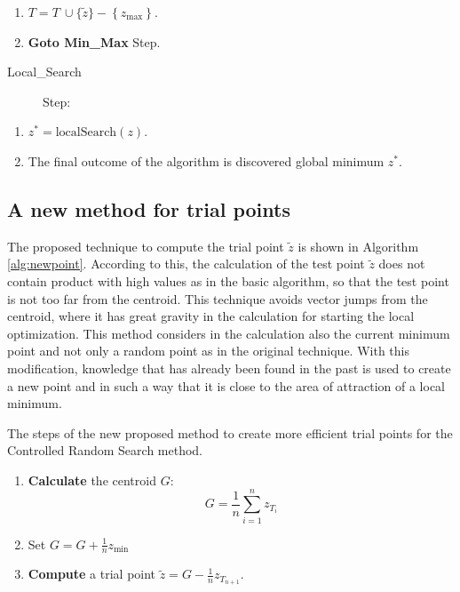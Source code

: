 \documentclass[symmetry,article,submit,moreauthors,pdftex]{Definitions/mdpi}
\begin{document}
\begin{algorithm}
\begin{description}
\end{description}
\begin{enumerate}
\item $T=T\ \cup\{\tilde{z}\}-\left\{ z_{\mbox{max}}\right\} $.
\item \textbf{Goto Min\_Max} Step.
\end{enumerate}
\begin{description}
\item [{Local\_Search}] Step:
\end{description}
\begin{enumerate}
\item $z^{*}=\mbox{localSearch}(z)$.
\item The final outcome of the algorithm is discovered global minimum $z^{*}$.
\end{enumerate}
\end{algorithm}


\subsection{A new method for trial points\label{subsec:A-new-method}}
The proposed technique to compute the trial point $\tilde{z}$ is
shown in Algorithm \ref{alg:newpoint}. 
According to this, the calculation of the test point $\tilde{z}$ does not contain product with high
values as in the basic algorithm, so that the test point is not too
far from the centroid. This technique avoids vector jumps from the
centroid, where it has great gravity in the calculation for starting
the local optimization. This method considers in the calculation also the current minimum point and not only a random point as in the original technique. With this modification, knowledge that has already been found in the past is used to create a new point and in such a way that it is close to the area of attraction of a local minimum. 

\begin{algorithm}

\caption{The steps of the new proposed method to create more efficient trial points for the Controlled Random Search method.\label{alg:newpoint}}

\begin{enumerate}
\item \textbf{Calculate} the centroid $G$: 
\[
G=\frac{1}{n}\sum_{i=1}^{n}z_{T_{i}}
\]
\item Set $G=G+\frac{1}{n}z_{\mbox{min}}$
\item \textbf{Compute} a trial point $\tilde{z}=G-\frac{1}{n}z_{T_{n+1}}$.
\end{enumerate}
\end{algorithm}
\end{document}
